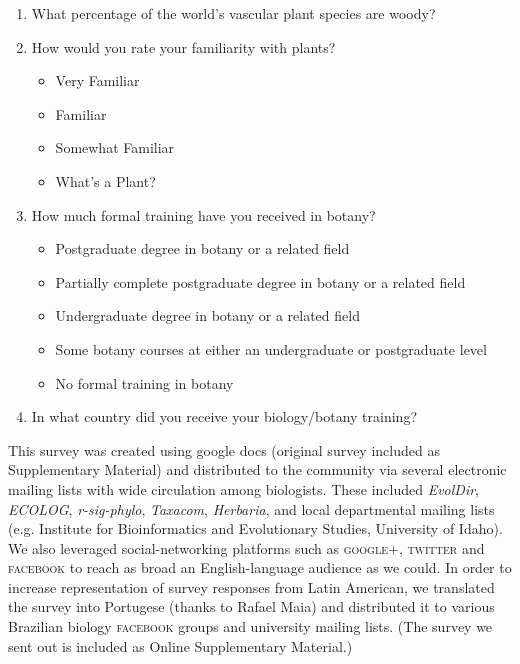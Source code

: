 \documentclass[12pt]{article}
\begin{document}
\begin{enumerate}

\item What percentage of the world's vascular plant species are woody?

\item How would you rate your familiarity with plants?

	\begin{itemize}
	
		\item Very Familiar
	
		\item Familiar
	
		\item Somewhat Familiar
	
		\item What's a Plant?
	
	\end{itemize}
	
\item How much formal training have you received in botany?

	\begin{itemize}
	
		\item Postgraduate degree in botany or a related field
		
		\item Partially complete postgraduate degree in botany or a related field
		
		\item Undergraduate degree in botany or a related field
		
		\item Some botany courses at either an undergraduate or postgraduate level
		
		\item No formal training in botany
		
	\end{itemize}
	
\item In what country did you receive your biology/botany training?

\end{enumerate}

This survey was created using google docs (original survey included as Supplementary Material) and distributed to the community via several electronic mailing lists with wide circulation among biologists. These included \emph{EvolDir}, \emph{ECOLOG}, \emph{r-sig-phylo}, \emph{Taxacom}, \emph{Herbaria}, and local departmental mailing lists (e.g. Institute for Bioinformatics and Evolutionary Studies, University of Idaho). We also leveraged social-networking platforms such as \textsc{google+}, \textsc{twitter} and \textsc{facebook} to reach as broad an English-language audience as we could. In order to increase representation of survey responses from Latin American, we translated the survey into Portugese (thanks to Rafael Maia) and distributed it to various Brazilian biology \textsc{facebook} groups and university mailing lists. (The survey we sent out is included as Online Supplementary Material.)
\end{document}

